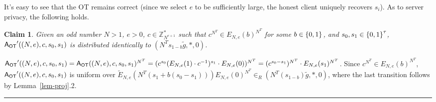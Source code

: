 \documentclass[11pt]{article}
\newtheorem{claim}[theorem]{Claim}
\newenvironment{proof}{\noindent {\bf Proof:} \hspace{.677em}}%
                     {\qed}
\newcommand{\qed}{\hspace*{\fill}\rule{0.6em}{0.6em}}
\newcommand{\ansot}{{\sf A_{OT}}}
\newcommand{\otl}{{\tau}}
\newcommand{\encdj}{{E}_{N,e}}
\newcommand{\encdjnr}{{\tilde{E}}_{N,e}}
\newcommand{\U}[1]{\mathbb{Z}_{#1}^*}
\newcommand\ot{\mbox{OT}\xspace}
\newcommand{\mathify}[1]{\ifmmode{#1}\else\mbox{$#1$}\fi}
\newcommand{\set}[2][]{\mathify{{\left\{#2\right\}}^{#1}}}
\newcommand{\bools}[1][]{\set[#1]{0,1}}
\begin{document}
It's easy to see that the \ot remains correct (since we select $e$ to be sufficiently large,
the honest client uniquely recovers $s_i$). As to server privacy, the following holds.
\begin{claim}
  \label{clm-ot-priv-mal-uncond}
  Given an odd number $N>1$, $e>0$, $c\in{\U{N^{e+1}}}$ such that $c^{N^T}\in\encdj(b)^{N^T}$ for some $b\in\bools$, and $s_0,s_1\in{\bools[\otl]}$, $\ansot'((N,e),c,s_0,s_1)$ is distributed identically to $(N^Ts_{1-b}\tilde{g},*,0)$.
\end{claim}
\begin{proof}
  $\ansot'((N,e),c,s_0,s_1)=\ansot((N,e),c,s_0,s_1)^{N^T}=(c^{s_0}(\encdj(1)\cdot
  c^{-1})^{s_1}\cdot\encdj(0))^{N^T}=(c^{s_0-s_1})^{N^T}\cdot\encdj(s_1)^{N^T}$.
  Since $c^{N^T}\in\encdj(b)^{N^T}$, $\ansot'((N,e),c,s_0,s_1)$ is
  uniform over
  $\encdjnr(N^T(s_1+b(s_0-s_1)))\encdj(0)^{N^T}\in_R(N^T(s_{1-b})\tilde{g},*,0)$,
  where the last transition follows by Lemma~\ref{lem-proj}.2.
\end{proof}
\end{document}
